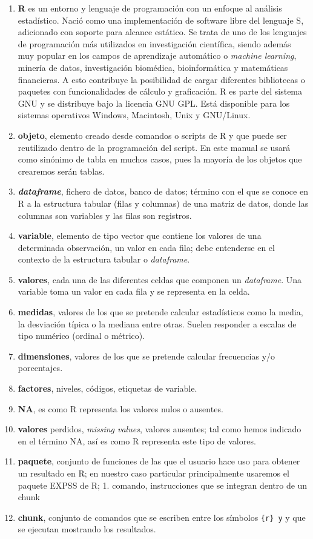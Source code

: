 \documentclass[
]{book}
\begin{document}
\begin{enumerate}
\def\labelenumi{\arabic{enumi}.}
\item
  \textbf{R} es un entorno y lenguaje de programación con un enfoque al análisis estadístico. Nació como una implementación de software libre del lenguaje S, adicionado con soporte para alcance estático. Se trata de uno de los lenguajes de programación más utilizados en investigación científica, siendo además muy popular en los campos de aprendizaje automático o \emph{machine learning}, minería de datos, investigación biomédica, bioinformática y matemáticas financieras. A esto contribuye la posibilidad de cargar diferentes bibliotecas o paquetes con funcionalidades de cálculo y graficación. R es parte del sistema GNU y se distribuye bajo la licencia GNU GPL. Está disponible para los sistemas operativos Windows, Macintosh, Unix y GNU/Linux.
\item
  \textbf{objeto}, elemento creado desde comandos o scripts de R y que puede ser reutilizado dentro de la programación del script. En este manual se usará como sinónimo de tabla en muchos casos, pues la mayoría de los objetos que crearemos serán tablas.
\item
  \textbf{\emph{dataframe}}, fichero de datos, banco de datos; término con el que se conoce en R a la estructura tabular (filas y columnas) de una matriz de datos, donde las columnas son variables y las filas son registros.
\item
  \textbf{variable}, elemento de tipo vector que contiene los valores de una determinada observación, un valor en cada fila; debe entenderse en el contexto de la estructura tabular o \emph{dataframe}.
\item
  \textbf{valores}, cada una de las diferentes celdas que componen un \emph{dataframe}. Una variable toma un valor en cada fila y se representa en la celda.
\item
  \textbf{medidas}, valores de los que se pretende calcular estadísticos como la media, la desviación típica o la mediana entre otras. Suelen responder a escalas de tipo numérico (ordinal o métrico).
\item
  \textbf{dimensiones}, valores de los que se pretende calcular frecuencias y/o porcentajes.
\item
  \textbf{factores}, niveles, códigos, etiquetas de variable.
\item
  \textbf{NA}, es como R representa los valores nulos o ausentes.
\item
  \textbf{valores} perdidos, \emph{missing values}, valores ausentes; tal como hemos indicado en el término NA, así es como R representa este tipo de valores.
\item
  \textbf{paquete}, conjunto de funciones de las que el usuario hace uso para obtener un resultado en R; en nuestro caso particular principalmente usaremos el paquete EXPSS de R; 1. comando, instrucciones que se integran dentro de un chunk
\item
  \textbf{chunk}, conjunto de comandos que se escriben entre los símbolos \texttt{\{r\}\ y} y que se ejecutan mostrando los resultados.
\end{enumerate}
\end{document}
